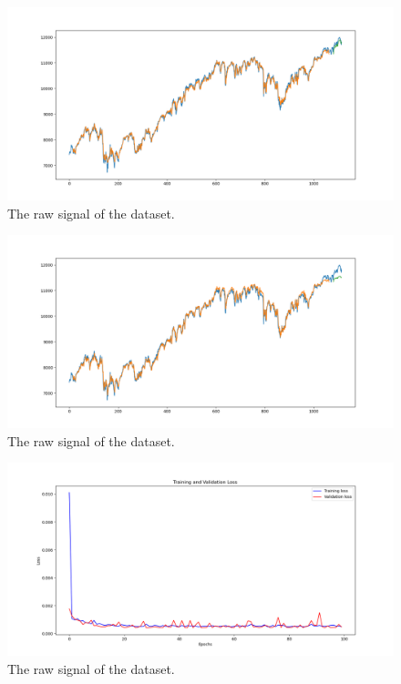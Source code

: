 \begin{figure}[H]
    \centering
    \begin{minipage}[b]{1\textwidth}
        \includegraphics[width=\textwidth]{manuscript/src/figures/Ass4/Ass4_Q2b_forcasted.png}
    \end{minipage}
    \caption{The raw signal of the dataset.}
    \label{fig:Ass4_Q2b_forcasted}
\end{figure}

\begin{figure}[H]
    \centering
    \begin{minipage}[b]{1\textwidth}
        \includegraphics[width=\textwidth]{manuscript/src/figures/Ass4/Ass4_Q2c_forcasted.png}
    \end{minipage}
    \caption{The raw signal of the dataset.}
    \label{fig:Ass4_Q2c_forcasted}
\end{figure}


\begin{figure}[H]
    \centering
    \begin{minipage}[b]{1\textwidth}
        \includegraphics[width=\textwidth]{manuscript/src/figures/Ass4/Ass4_Q2a_Training and Validation Loss.png}
    \end{minipage}
    \caption{The raw signal of the dataset.}
    \label{fig:Ass4_Q2a_Training}
\end{figure}

